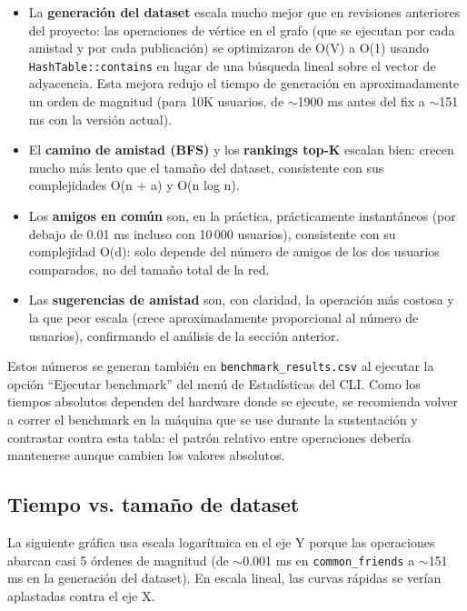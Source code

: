 \documentclass[11pt,a4paper]{article}
\begin{document}
\begin{itemize}[leftmargin=1.4em]
    \item La \textbf{generación del dataset} escala mucho mejor que en
    revisiones anteriores del proyecto: las operaciones de vértice en el
    grafo (que se ejecutan por cada amistad y por cada publicación) se
    optimizaron de O(V) a O(1) usando \texttt{HashTable::contains} en lugar
    de una búsqueda lineal sobre el vector de adyacencia. Esta mejora
    redujo el tiempo de generación en aproximadamente un orden de magnitud
    (para 10K usuarios, de $\sim$1900 ms antes del fix a $\sim$151 ms con
    la versión actual).
    \item El \textbf{camino de amistad (BFS)} y los \textbf{rankings
    top-K} escalan bien: crecen mucho más lento que el tamaño del
    dataset, consistente con sus complejidades O(n + a) y O(n log n).
    \item Los \textbf{amigos en común} son, en la práctica, prácticamente
    instantáneos (por debajo de 0.01 ms incluso con 10\,000 usuarios),
    consistente con su complejidad O(d): solo depende del número de
    amigos de los dos usuarios comparados, no del tamaño total de la red.
    \item Las \textbf{sugerencias de amistad} son, con claridad, la
    operación más costosa y la que peor escala (crece
    aproximadamente proporcional al número de usuarios), confirmando el
    análisis de la sección anterior.
\end{itemize}

Estos números se generan también en \texttt{benchmark\_results.csv} al
ejecutar la opción ``Ejecutar benchmark'' del menú de Estadísticas del
CLI. Como los tiempos absolutos dependen del hardware donde se ejecute,
se recomienda volver a correr el benchmark en la máquina que se use
durante la sustentación y contrastar contra esta tabla: el patrón
relativo entre operaciones debería mantenerse aunque cambien los valores
absolutos.

\subsection{Tiempo vs. tamaño de dataset}

La siguiente gráfica usa escala logarítmica en el eje Y porque las
operaciones abarcan casi 5 órdenes de magnitud (de $\sim$0.001 ms en
\texttt{common\_friends} a $\sim$151 ms en la generación del dataset). En
escala lineal, las curvas rápidas se verían aplastadas contra el eje X.
\end{document}
